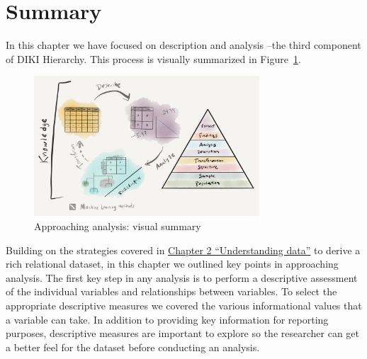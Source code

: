 \documentclass[
  letterpaper,
]{latex/krantz}
\begin{document}
\hypertarget{summary-3}{%
\section*{Summary}\label{summary-3}}


In this chapter we have focused on description and analysis --the third
component of DIKI Hierarchy. This process is visually summarized in
Figure~\ref{fig-approaching-analysis-visual-summary-graphic}.

\begin{figure}[h]

{\centering \includegraphics[width=0.75\textwidth,height=\textheight]{figures/approaching-analysis/approaching-analysis-visual-summary-paper.png}

}

\caption{\label{fig-approaching-analysis-visual-summary-graphic}Approaching
analysis: visual summary}

\end{figure}

Building on the strategies covered in
\protect\hyperlink{sec-understanding-data}{Chapter 2 ``Understanding
data''} to derive a rich relational dataset, in this chapter we outlined
key points in approaching analysis. The first key step in any analysis
is to perform a descriptive assessment of the individual variables and
relationships between variables. To select the appropriate descriptive
measures we covered the various informational values that a variable can
take. In addition to providing key information for reporting purposes,
descriptive measures are important to explore so the researcher can get
a better feel for the dataset before conducting an analysis.
\end{document}
